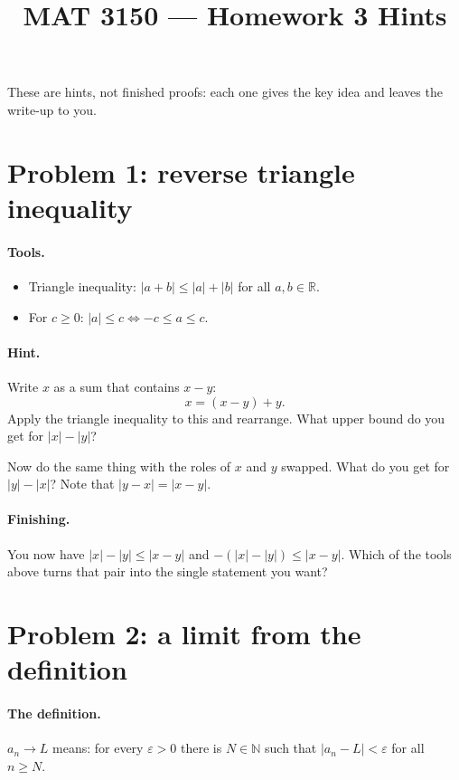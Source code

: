\documentclass[11pt]{article}
\title{MAT 3150 --- Homework 3 Hints}
\author{}
\date{}
\begin{document}
\maketitle

These are hints, not finished proofs: each one gives the key idea and
leaves the write-up to you.

\section*{Problem 1: reverse triangle inequality}

\paragraph{Tools.}
\begin{itemize}
  \item Triangle inequality: $|a+b|\le|a|+|b|$ for all $a,b\in\mathbb{R}$.
  \item For $c\ge 0$: \quad $|a|\le c \iff -c\le a\le c$.
\end{itemize}

\paragraph{Hint.}
Write $x$ as a sum that contains $x-y$:
\[
  x = (x-y) + y .
\]
Apply the triangle inequality to this and rearrange. What upper bound do
you get for $|x|-|y|$?

Now do the same thing with the roles of $x$ and $y$ swapped. What do you
get for $|y|-|x|$? Note that $|y-x|=|x-y|$.

\paragraph{Finishing.} You now have $|x|-|y|\le|x-y|$ and
$-(|x|-|y|)\le|x-y|$. Which of the tools above turns that pair into the
single statement you want?

\section*{Problem 2: a limit from the definition}

\paragraph{The definition.} $a_n\to L$ means: for every $\varepsilon>0$
there is $N\in\mathbb{N}$ such that $|a_n-L|<\varepsilon$ for all
$n\ge N$.
\end{document}
